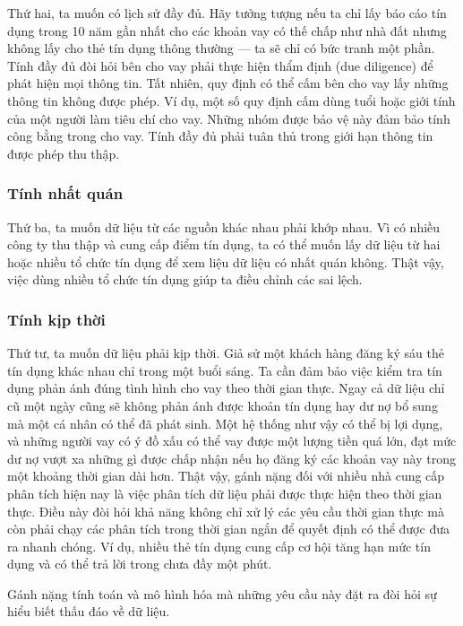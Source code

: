 Thứ hai, ta muốn có lịch sử đầy đủ. Hãy tưởng tượng nếu ta chỉ lấy báo cáo tín dụng trong 10 năm gần nhất cho các khoản vay có thế chấp như nhà đất nhưng không lấy cho thẻ tín dụng thông thường — ta sẽ chỉ có bức tranh một phần. Tính đầy đủ đòi hỏi bên cho vay phải thực hiện thẩm định (due diligence) để phát hiện mọi thông tin. Tất nhiên, quy định có thể cấm bên cho vay lấy những thông tin không được phép. Ví dụ, một số quy định cấm dùng tuổi hoặc giới tính của một người làm tiêu chí cho vay. Những nhóm được bảo vệ này đảm bảo tính công bằng trong cho vay. Tính đầy đủ phải tuân thủ trong giới hạn thông tin được phép thu thập.

\subsubsection{Tính nhất quán}

Thứ ba, ta muốn dữ liệu từ các nguồn khác nhau phải khớp nhau. Vì có nhiều công ty thu thập và cung cấp điểm tín dụng, ta có thể muốn lấy dữ liệu từ hai hoặc nhiều tổ chức tín dụng để xem liệu dữ liệu có nhất quán không. Thật vậy, việc dùng nhiều tổ chức tín dụng giúp ta điều chỉnh các sai lệch.

\subsubsection{Tính kịp thời}

Thứ tư, ta muốn dữ liệu phải kịp thời. Giả sử một khách hàng đăng ký sáu thẻ tín dụng khác nhau chỉ trong một buổi sáng. Ta cần đảm bảo việc kiểm tra tín dụng phản ánh đúng tình hình cho vay theo thời gian thực. Ngay cả dữ liệu chỉ cũ một ngày cũng sẽ không phản ánh được khoản tín dụng hay dư nợ bổ sung mà một cá nhân có thể đã phát sinh. Một hệ thống như vậy có thể bị lợi dụng, và những người vay có ý đồ xấu có thể vay được một lượng tiền quá lớn, đạt mức dư nợ vượt xa những gì được chấp nhận nếu họ đăng ký các khoản vay này trong một khoảng thời gian dài hơn. Thật vậy, gánh nặng đối với nhiều nhà cung cấp phân tích hiện nay là việc phân tích dữ liệu phải được thực hiện theo thời gian thực. Điều này đòi hỏi khả năng không chỉ xử lý các yêu cầu thời gian thực mà còn phải chạy các phân tích trong thời gian ngắn để quyết định có thể được đưa ra nhanh chóng. Ví dụ, nhiều thẻ tín dụng cung cấp cơ hội tăng hạn mức tín dụng và có thể trả lời trong chưa đầy một phút.

Gánh nặng tính toán và mô hình hóa mà những yêu cầu này đặt ra đòi hỏi sự hiểu biết thấu đáo về dữ liệu.

